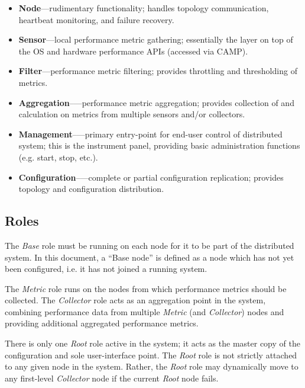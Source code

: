 \begin{itemize}

\item \textbf{Node}---rudimentary \dcamp functionality; handles topology communication, heartbeat monitoring, and failure
      recovery.
\item \textbf{Sensor}---local performance metric gathering; essentially the \dcamp layer on top of the OS and hardware
      performance APIs (accessed via CAMP).
\item \textbf{Filter}---performance metric filtering; provides throttling and thresholding of metrics.
\item \textbf{Aggregation}--—performance metric aggregation; provides collection of and calculation on metrics from
      multiple sensors and/or collectors.
\item \textbf{Management}--—primary entry-point for end-user control of \dcamp distributed system; this is the \dcamp
      instrument panel, providing basic administration functions (e.g. start, stop, etc.).
\item \textbf{Configuration}--—complete or partial configuration replication; provides topology and configuration
      distribution.

\end{itemize}

\subsection{Roles}

The \textit{Base} role must be running on each node for it to be part of the \dcamp distributed system. In this document,
a ``Base node'' is defined as a \dcamp node which has not yet been configured, i.e. it has not joined a running \dcamp
system.

The \textit{Metric} role runs on the nodes from which performance metrics should be collected. The \textit{Collector}
role acts as an aggregation point in the system, combining performance data from multiple \textit{Metric} (and
\textit{Collector}) nodes and providing additional aggregated performance metrics.

There is only one \textit{Root} role active in the system; it acts as the master copy of the \dcamp configuration and
sole user-interface point. The \textit{Root} role is not strictly attached to any given node in the system. Rather, the
\textit{Root} role may dynamically move to any first-level \textit{Collector} node if the current \textit{Root} node
fails.

